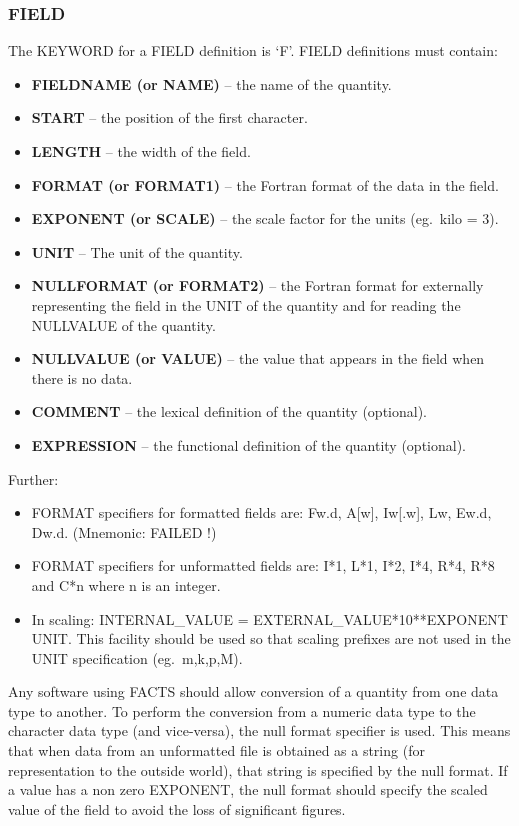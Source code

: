 \subsubsection {FIELD}
The KEYWORD for a FIELD definition is `F'.
FIELD definitions must contain:
\begin{itemize}
\item {\bf FIELDNAME (or NAME)} --  the name of the quantity.
\item {\bf START} --  the position of the first character.
\item {\bf LENGTH} --  the width of the field.
\item {\bf FORMAT (or FORMAT1)} --  the Fortran format of the data in the field.
\item {\bf EXPONENT (or SCALE)} --  the scale factor for the units
(eg.\ kilo = 3).
\item {\bf UNIT} --  The unit of the quantity.
\item {\bf NULLFORMAT (or FORMAT2)} -- the Fortran format for externally
representing the field in the UNIT of the quantity and for reading the
NULLVALUE of the quantity.
\item {\bf NULLVALUE (or VALUE)} -- the value that appears in the field when
there is no data.
\item {\bf COMMENT} --  the lexical definition of the quantity (optional).
\item {\bf EXPRESSION} -- the functional definition of the quantity (optional).
\end{itemize}
Further:
\begin{itemize}
\item FORMAT specifiers for formatted fields are:
Fw.d, A[w], Iw[.w], Lw, Ew.d, Dw.d. (Mne\-monic: FAILED !)
\item FORMAT specifiers for unformatted fields are:
I*1, L*1, I*2, I*4, R*4, R*8 and C*n where n is an integer.
\item In scaling: INTERNAL\_VALUE = EXTERNAL\_VALUE*10**EXPONENT UNIT.
This facility should be used so that scaling prefixes are not used in the
UNIT specification (eg.\ m,k,p,M).
\end{itemize}
Any software using FACTS should allow conversion of a quantity from one data
type to another.
To perform the conversion from a numeric data type to the character data type
(and vice-versa), the null format specifier is used.
This means that when data from an unformatted file is obtained as a string (for
representation to the outside world), that string is specified by the null
format.
If a value has a non zero EXPONENT, the null format should specify the scaled
value of the field to avoid the loss of significant figures.
